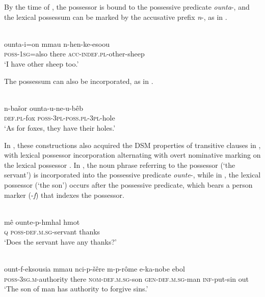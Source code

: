\documentclass[output=paper]{LSP/langsci}
\begin{document}
By the time of , the possessor is bound to the possessive predicate \textit{ounta}-, and the lexical possessum can be marked by the accusative prefix \textit{n}-, as in .

\begin{exe}
\ex%
\label{05-gr-ex:55}
\\
\gll ounta-i=on mmau n-hen-ke-esoou\\
\textsc{poss-1sg}=also there \textsc{acc-indef.pl}-other-sheep\\
\glt ‘I have other sheep too.’
\end{exe}

The possessum can also be incorporated, as in .

\begin{exe}
\ex%
\label{05-gr-ex:56}
\\
\gll n-bašor ounta-u-ne-u-bêb\\
\textsc{def.pl}-fox \textsc{poss-3pl-poss.pl}-\textsc{3pl}-hole\\
\glt ‘As for foxes, they have their holes.’
\end{exe}

In , these constructions also acquired the DSM properties of transitive clauses in  \citep{Grossman2015Verb}, with lexical possessor incorporation  alternating with overt nominative marking on the lexical possessor . In , the noun phrase referring to the possessor (‘the servant’) is incorporated into the possessive predicate \textit{ounte}-, while in , the lexical possessor (‘the son’) occurs after the possessive predicate, which bears a person marker (-\textit{f}) that indexes the possessor. 

\begin{exe}
\ex%
\label{05-gr-ex:57}
\\
\gll mê ounte-p-hmhal hmot\\
\textsc{q} \textsc{poss}-\textsc{def.m.sg}-servant thanks\\
\glt `Does the servant have any thanks?'
\end{exe}

\begin{exe}
\ex%
\label{05-gr-ex:58}
\\
\gll ount-f-eksousia mmau nci-p-šêre m-p-rôme e-ka-nobe ebol\\
\textsc{poss-3sg.m}-authority there \textsc{nom-def.m.sg}-son \textsc{gen-def.m.sg}-man \textsc{inf}-put-sin out\\
\glt ‘The son of man has authority to forgive sins.’ 
\end{exe}
\end{document}
